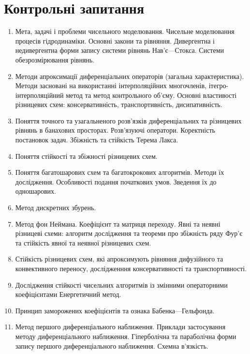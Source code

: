 \section{Контрольні запитання}
\begin{enumerate}
    \item Мета, задачі і проблеми чисельного моделювання. Чисельне моделювання процесів гідродинаміки. Основні закони та рівняння. Дивергентна і недивергентна форми запису системи рівнянь Нав'є---Стокса. Системи обезрозмірювання рівнянь. 

    \item Методи апроксимації диференціальних операторів (загальна характеристика). Методи засновані на використанні інтерполяційних многочленів, ітегро-інтерпо\-ляційний метод та метод контрольного об'єму. Основні властивості різницевих схем: консервативність, транспортивність, дисипативність.

    \item Поняття точного та узагальненого розв'язків диференціальних та різницевих рівнянь в банахових просторах. Розв'язуючі оператори. Коректність постановок задач. Збіжність та стійкість Терема Лакса. 

    \item Поняття стійкості та збіжності різницевих схем. 

    \item Поняття багатошарових схем та багатокрокових алгоритмів. Методи їх дослідження. Особливості подання початкових умов. Зведення їх до одношарових.

    \item Метод дискретних збурень.

    \item Метод фон Неймана. Коефіцієнт та матриця переходу. Явні та неявні різницеві схеми: алгоритм дослідження та теореми про збіжність ряду Фур'є та стійкість явної та неявної різницевих схем.

    \item Стійкість різницевих схем, які апроксимують рівняння дифузійного та конвективного переносу, дослідженння консервативності та транспортивності.

    \item Дослідження стійкості чисельних алгоритмів із змінними операторними коефіцієнтами Енергетичний метод.

    \item Принцип заморожених коефіцієнтів та ознака Бабенка---Гельфонда. 

    \item Метод першого диференціального наближення. Приклади застосування методу диференціального наближення. Гіперболічна та параболічна форми запису першого диференціального наближення. Схемна в'язкість.
\end{enumerate}
